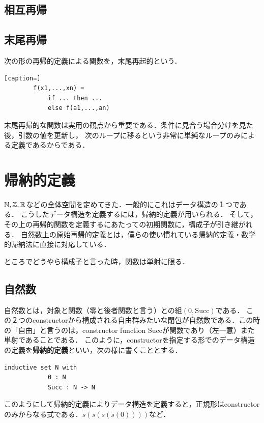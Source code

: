 \documentclass[uplatex, dvipdfmx]{jsreport}
\begin{document}
\subsection{相互再帰}

\subsection{末尾再帰}

\begin{definition}[末尾再帰関数]
    次の形の再帰的定義による関数を，末尾再起的という．
    \begin{lstlisting}[caption=]
        f(x1,...,xn) =
            if ... then ...
            else f(a1,...,an)
    \end{lstlisting}
\end{definition}
\begin{remark}
    末尾再帰的な関数は実用の観点から重要である．条件に見合う場合分けを見た後，引数の値を更新し，
    次のループに移るという非常に単純なループのみによる定義であるからである．
\end{remark}

\section{帰納的定義}

$\mathbb{N},\mathbb{Z},\mathbb{R}$などの全体空間を定めてきた．一般的にこれはデータ構造の１つである．
こうしたデータ構造を定義するには，帰納的定義が用いられる．
そして，その上の再帰的関数を定義するにあたっての初期関数に，構成子が引き継がれる．
自然数上の原始再帰的定義とは，僕らの使い慣れている帰納的定義・数学的帰納法に直接に対応している．

ところでどうやら構成子と言った時，関数は単射に限る．

\subsection{自然数}
\begin{definition}
    自然数とは，対象と関数（零と後者関数と言う）との組$(0,\mathrm{Succ})$である．
    この２つのconstructorから構成される自由群みたいな閉包が自然数である．この時の「自由」と言うのは，constructor function Succが関数であり（左一意）また単射であることである．
    このように，constructorを指定する形でのデータ構造の定義を\textbf{帰納的定義}といい，次の様に書くこととする．
    \begin{lstlisting}[caption=inductive definition]
        inductive set N with
            0 : N
            Succ : N -> N
    \end{lstlisting}
\end{definition}
\begin{remark}
    このようにして帰納的定義によりデータ構造を定義すると，正規形はconstructorのみからなる式である．$s(s(s(s(0))))$など．
\end{remark}
\end{document}
